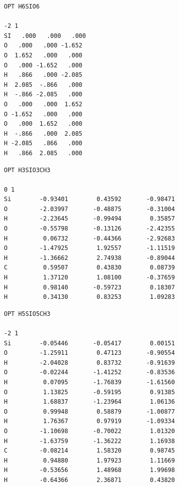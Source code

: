 \documentclass[
  printed, %
  table,   %
  lof,     %
  lot,     %
  oneside,
]{fithesis3}
\begin{document}
 \begin{lstlisting}[frame=single, caption={\ce{(H6SiO6)^{2-}} },label=DescriptiveLabel]
OPT H6SIO6 

-2 1
SI   .000   .000   .000  
O   .000   .000 -1.652 
O  1.652   .000   .000 
O   .000 -1.652   .000 
H   .866   .000 -2.085 
H  2.085  -.866   .000 
H  -.866 -2.085   .000 
O   .000   .000  1.652 
O -1.652   .000   .000 
O   .000  1.652   .000 
H  -.866   .000  2.085 
H -2.085   .866   .000 
H   .866  2.085   .000
 \end{lstlisting}
  
  \newpage
  
  \begin{lstlisting}[frame=single, caption={\ce{H3SiO3CH3}},label=DescriptiveLabel]
OPT H3SIO3CH3

0 1
Si        -0.93401        0.43592       -0.98471
O         -2.03997       -0.48875       -0.31004
H         -2.23645       -0.99494        0.35857
O         -0.55798       -0.13126       -2.42355
H          0.06732       -0.44366       -2.92683
O         -1.47925        1.92557       -1.11519
H         -1.36662        2.74938       -0.89044
C          0.59507        0.43830        0.08739
H          1.37120        1.08100       -0.37659
H          0.98140       -0.59723        0.18307
H          0.34130        0.83253        1.09283
 \end{lstlisting}

\begin{lstlisting}[frame=single, caption={\ce{H5SiO5CH3}},label=DescriptiveLabel]
OPT H5SIO5CH3

-2 1
Si        -0.05446       -0.05417        0.00151
O         -1.25911        0.47123       -0.90554
H         -2.04028        0.83732       -0.91639
O         -0.02244       -1.41252       -0.83536
H          0.07095       -1.76839       -1.61560
O          1.13825       -0.59195        0.91385
H          1.68837       -1.23964        1.06136
O          0.99948        0.58879       -1.00877
H          1.76367        0.97919       -1.09334
O         -1.10698       -0.70022        1.01320
H         -1.63759       -1.36222        1.16938
C         -0.08214        1.58320        0.98745
H          0.94880        1.97923        1.11669
H         -0.53656        1.48968        1.99698
H         -0.64366        2.36871        0.43820

 \end{lstlisting}
 \newpage
 
\end{document}
